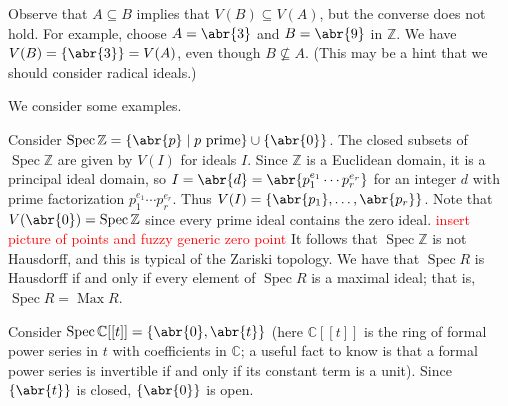 \documentclass[11pt,leqno]{article}
\newcommand{\sai}[1]{\textcolor{red}{#1}}
\theoremstyle{plain}
\theoremstyle{definition}
\numberwithin{equation}{section}
\numberwithin{lem}{section}
\newcommand{\cbr}[1]{\left\{#1\right\}}
\DeclareMathOperator{\Max}{Max}
\DeclareMathOperator{\Spec}{Spec}
\begin{document}
Observe that $A\subseteq B$ implies that $V(B)\subseteq V(A)$, but the converse does not hold. For example, choose $A = \abr{3}$ and $B = \abr{9}$ in $\mathbb Z$. We have $V(B) = \cbr{\abr{3}} = V(A)$, even though $B\not\subseteq A$. (This may be a hint that we should consider radical ideals.)

We consider some examples.

Consider $\Spec \mathbb Z = \cbr{\abr{p}\mid p\text{ prime}}\cup\cbr{\abr{0}}$. The closed subsets of $\Spec \mathbb Z$ are given by $V(I)$ for ideals $I$. Since $\mathbb Z$ is a Euclidean domain, it is a principal ideal domain, so $I = \abr{d} = \abr{p_1^{e_1}\cdots p_r^{e_r}}$ for an integer $d$ with prime factorization $p_1^{e_1}\cdots p_r^{e_r}$. Thus $V(I) = \cbr{\abr{p_1},\dots,\abr{p_r}}$. Note that $V(\abr{0}) = \Spec \mathbb Z$ since every prime ideal contains the zero ideal. \sai{insert picture of points and fuzzy generic zero point}
It follows that $\Spec \mathbb Z$ is not Hausdorff, and this is typical of the Zariski topology. We have that $\Spec R$ is Hausdorff if and only if every element of $\Spec R$ is a maximal ideal; that is, $\Spec R = \Max R$.

Consider $\Spec \mathbb C[[t]] = \cbr{\abr{0},\abr{t}}$ (here $\mathbb C[[t]]$ is the ring of formal power series in $t$ with coefficients in $\mathbb C$; a useful fact to know is that a formal power series is invertible if and only if its constant term is a unit). Since $\cbr{\abr{t}}$ is closed, $\cbr{\abr{0}}$ is open.
\end{document}
